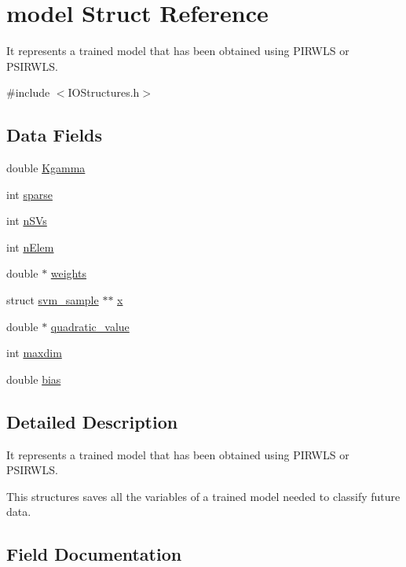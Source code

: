 \hypertarget{structmodel}{}\section{model Struct Reference}
\label{structmodel}


It represents a trained model that has been obtained using P\+I\+R\+W\+LS or P\+S\+I\+R\+W\+LS.  




{\ttfamily \#include $<$I\+O\+Structures.\+h$>$}

\subsection*{Data Fields}
\begin{DoxyCompactItemize}
\item 
double \hyperlink{structmodel_ac5c18eca6ad32bc6da1f2a923965e66c}{Kgamma}
\item 
int \hyperlink{structmodel_ad00b5b9bbafcd18eb6367c90d9471231}{sparse}
\item 
int \hyperlink{structmodel_a3b73d79940bbdae365676c4fa56e96ea}{n\+S\+Vs}
\item 
int \hyperlink{structmodel_a4877089d41daf2186482e0e6f900d65f}{n\+Elem}
\item 
double $\ast$ \hyperlink{structmodel_a658dab89d4b4b1a5bd28cdfb4abafe39}{weights}
\item 
struct \hyperlink{structsvm__sample}{svm\+\_\+sample} $\ast$$\ast$ \hyperlink{structmodel_a81da41c8731f95de344a068d302eb336}{x}
\item 
double $\ast$ \hyperlink{structmodel_a623da3d1f5116fd4d66873b95eb2e720}{quadratic\+\_\+value}
\item 
int \hyperlink{structmodel_ac6ba8c1bc138143114cd331583f41387}{maxdim}
\item 
double \hyperlink{structmodel_a9aef7cc709fca4e03a021623ce6c7ae6}{bias}
\end{DoxyCompactItemize}


\subsection{Detailed Description}
It represents a trained model that has been obtained using P\+I\+R\+W\+LS or P\+S\+I\+R\+W\+LS. 

This structures saves all the variables of a trained model needed to classify future data. 

\subsection{Field Documentation}
\hypertarget{structmodel_a9aef7cc709fca4e03a021623ce6c7ae6}{}\label{structmodel_a9aef7cc709fca4e03a021623ce6c7ae6} 
